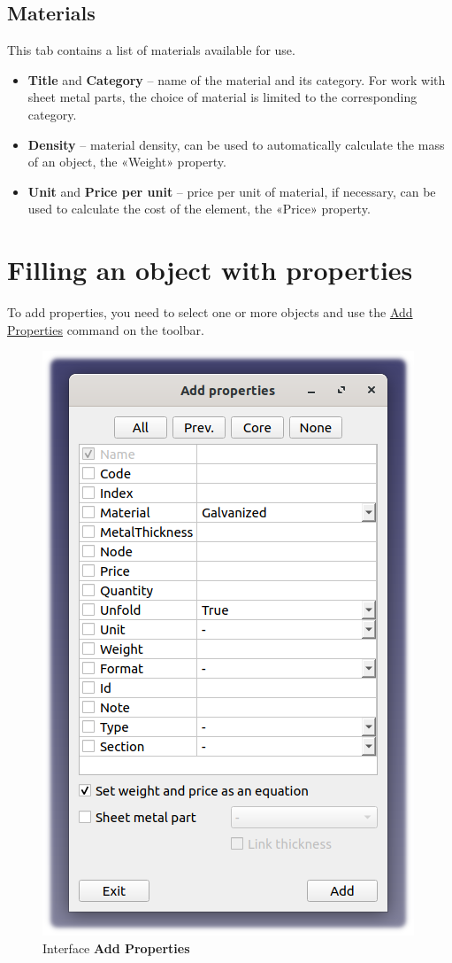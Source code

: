 \documentclass[a4paper,12pt]{article}
\begin{document}
\subsection{Materials}
This tab contains a list of materials available for use.
\begin{itemize}
    \item \textbf{Title} and \textbf{Category} -- name of the material and its category. For work with sheet metal parts, the choice of material is limited to the corresponding category.
    \item \textbf{Density} -- material density, can be used to automatically calculate the mass of an object, the «Weight» property.
    \item \textbf{Unit} and \textbf{Price per unit} -- price per unit of material, if necessary, can be used to calculate the cost of the element, the «Price» property.
\end{itemize}

\pagebreak




\section{Filling an object with properties}

To add properties, you need to select one or more objects and use the \hyperref[sec:5]{Add Properties} command on the toolbar.

\begin{figure}[htp]
	\centering
	\includegraphics[scale=0.75]{img/properties_add.png}
	\caption{Interface \textbf{Add Properties}}
	\label{sec:properties_add}
\end{figure}
\end{document}
